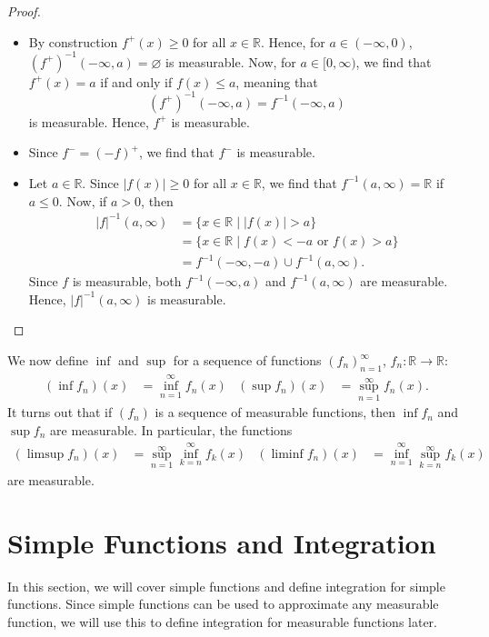 \documentclass[a4paper, openany]{memoir}
\theoremstyle{definition}
\theoremstyle{plain}
\begin{document}
    \begin{proof}
        \hspace*{0pt}
        \begin{itemize}
            \item By construction $f^+(x) \geq 0$ for all $x \in \mathbb{R}$. Hence, for $a \in (-\infty, 0)$, $(f^+)^{-1}(-\infty, a) = \varnothing$ is measurable. Now, for $a \in [0, \infty)$, we find that $f^+(x) = a$ if and only if $f(x) \leq a$, meaning that 
            \[(f^+)^{-1}(-\infty, a) = f^{-1}(-\infty, a)\]
            is measurable. Hence, $f^+$ is measurable.

            \item Since $f^- = (-f)^+$, we find that $f^-$ is measurable.
            
            \item Let $a \in \mathbb{R}$. Since $|f(x)| \geq 0$ for all $x \in \mathbb{R}$, we find that $f^{-1}(a, \infty) = \mathbb{R}$ if $a \leq 0$. Now, if $a > 0$, then
            \begin{align*}
                |f|^{-1}(a, \infty) &= \{x \in \mathbb{R} \mid |f(x)| > a\} \\
                &= \{x \in \mathbb{R} \mid f(x) < -a \textrm{ or } f(x) > a\} \\
                &= f^{-1}(-\infty, -a) \cup f^{-1}(a, \infty).
            \end{align*}
            Since $f$ is measurable, both $f^{-1}(-\infty, a)$ and $f^{-1}(a, \infty)$ are measurable. Hence, $|f|^{-1}(a, \infty)$ is measurable.
        \end{itemize}
    \end{proof}

    We now define $\inf$ and $\sup$ for a sequence of functions $(f_n)_{n=1}^\infty$, $f_n \colon \mathbb{R} \to \mathbb{R}$:
    \begin{align*}
        (\inf f_n)(x) &= \inf_{n=1}^\infty f_n(x) & (\sup f_n)(x) &= \sup_{n=1}^\infty f_n(x).
    \end{align*}
    It turns out that if $(f_n)$ is a sequence of measurable functions, then $\inf f_n$ and $\sup f_n$ are measurable. In particular, the functions
    \begin{align*}
        (\limsup f_n)(x) &= \sup_{n=1}^\infty \inf_{k=n}^\infty f_k(x) & (\liminf f_n)(x) &= \inf_{n=1}^\infty \sup_{k=n}^\infty f_k(x)
    \end{align*}
    are measurable.
    \newpage

    \section{Simple Functions and Integration}
    In this section, we will cover simple functions and define integration for simple functions. Since simple functions can be used to approximate any measurable function, we will use this to define integration for measurable functions later.
\end{document}
